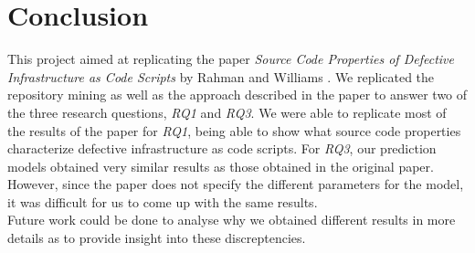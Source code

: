 
\section{Conclusion}
This project aimed at replicating the paper \textit{Source Code Properties of Defective Infrastructure as Code Scripts} by Rahman and Williams \cite{b1}. We replicated the repository mining as well as the approach described in the paper to answer two of the three research questions, \textit{RQ1} and \textit{RQ3}. We were able to replicate most of the results of the paper for \textit{RQ1}, being able to show what source code properties characterize defective infrastructure as code scripts. For \textit{RQ3}, our prediction models obtained very similar results as those obtained in the original paper. However, since the paper does not specify the different parameters for the model, it was difficult for us to come up with the same results. \\
Future work could be done to analyse why we obtained different results in more details as to provide insight into these discreptencies.
